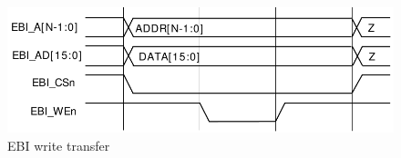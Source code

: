 \begin{figure}[h]
	\centering
	\includegraphics[width=0.8\linewidth]{figures/fpga/ebi_write.png}
	\caption{EBI write transfer\cite[p.6]{efm_ebi}}
	\label{fig:ebi_write}
\end{figure}


